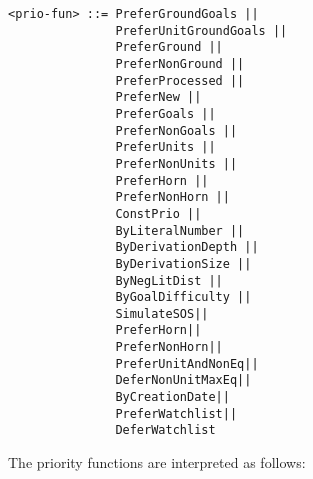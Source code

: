 \documentclass{report}
\begin{document}
\begin{verbatim}
<prio-fun> ::= PreferGroundGoals ||
               PreferUnitGroundGoals ||
               PreferGround ||
               PreferNonGround ||
               PreferProcessed ||
               PreferNew ||
               PreferGoals ||
               PreferNonGoals ||
               PreferUnits ||
               PreferNonUnits ||
               PreferHorn ||
               PreferNonHorn ||
               ConstPrio ||
               ByLiteralNumber ||
               ByDerivationDepth ||
               ByDerivationSize ||
               ByNegLitDist ||
               ByGoalDifficulty ||
               SimulateSOS||
               PreferHorn||
               PreferNonHorn||
               PreferUnitAndNonEq||
               DeferNonUnitMaxEq||
               ByCreationDate||
               PreferWatchlist||
               DeferWatchlist
\end{verbatim}

The priority functions are interpreted as follows:
\end{document}
